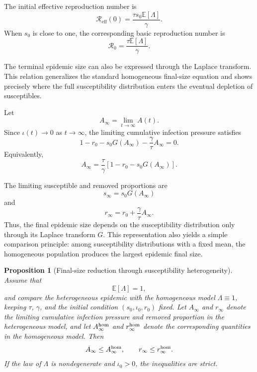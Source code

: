 \documentclass[pdflatex,sn-mathphys-ay]{sn-jnl}
\theoremstyle{thmstyleone}
\newtheorem{proposition}[theorem]{Proposition}
\theoremstyle{thmstyletwo}
\theoremstyle{thmstylethree}
\newcommand{\E}{\mathbb{E}}
\begin{document}
The initial effective reproduction number is
\[
\mathcal R_{\mathrm{eff}}(0)
=
\frac{\tau s_0\E[\Lambda]}{\gamma}.
\]
When \(s_0\) is close to one, the corresponding basic reproduction number is
\[
\mathcal R_0
=
\frac{\tau\E[\Lambda]}{\gamma}.
\]


The terminal epidemic size can also be expressed through the Laplace transform.
This relation generalizes the standard homogeneous final-size equation and
shows precisely where the full susceptibility distribution enters the
eventual depletion of susceptibles.

Let
\[
A_\infty=\lim_{t\to\infty}A(t).
\]
Since \(\iota(t)\to 0\) as \(t\to\infty \), the limiting cumulative infection pressure satisfies
\[
1-r_0-s_0G(A_\infty)
-\frac{\gamma}{\tau}A_\infty
=0.
\]
Equivalently,
\[
A_\infty
=
\frac{\tau}{\gamma}
\left[
1-r_0-s_0G(A_\infty)
\right].
\]

The limiting susceptible and removed proportions are
\[
s_\infty=s_0G(A_\infty)
\]
and
\[
r_\infty=r_0+\frac{\gamma}{\tau}A_\infty.
\]
Thus, the final epidemic size depends on the susceptibility distribution only
through its Laplace transform \(G\).
 This representation also yields a
simple comparison principle: among susceptibility distributions with a fixed
mean, the homogeneous population produces the largest epidemic final size.

\begin{proposition}[Final-size reduction through susceptibility heterogeneity]
\label{thm:final_size}
Assume that
\[
\E[\Lambda]=1,
\]
and compare the heterogeneous epidemic with the homogeneous model
\(\Lambda\equiv 1\), keeping \(\tau\), \(\gamma\), and the initial condition
\((s_0,\iota_0,r_0)\) fixed. Let \(A_\infty\) and \(r_\infty\) denote the
limiting cumulative infection pressure and removed proportion in the
heterogeneous model, and let \(A_\infty^{\rm hom}\) and
\(r_\infty^{\rm hom}\) denote the corresponding quantities in the
homogeneous model. Then
\[
A_\infty\leq A_\infty^{\rm hom},
\qquad
r_\infty\leq r_\infty^{\rm hom}.
\]
If the law of \(\Lambda\) is nondegenerate and \(\iota_0>0\), the inequalities
are strict.
\end{proposition}
\end{document}
